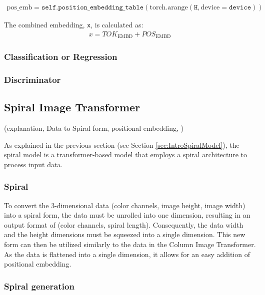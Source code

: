 \begin{align*}
    \text{pos\_emb} = \texttt{self.position\_embedding\_table}(\text{torch.arange}(\texttt{H}, \text{device}=\texttt{device}))
\end{align*}

The combined embedding, \texttt{x}, is calculated as:
\begin{align*}
    x = TOK_{\text{EMBD}} + POS_{\text{EMBD}}
\end{align*}

    

    \subsubsection{Classification or Regression}

    \subsubsection{Discriminator}

\newpage


\subsection{Spiral Image Transformer}
    (explanation, Data to Spiral form, positional embedding, )

    As explained in the previous section (see Section \ref{sec:IntroSpiralModel}), the spiral model is a transformer-based model that employs a spiral architecture to process input data. 

    \subsubsection{Spiral}

    To convert the 3-dimensional data (color channels, image height, image width) into a spiral form, the data must be unrolled into one dimension, resulting in an output format of (color channels, spiral length). Consequently, the data width and the height dimensions must be squeezed into a single dimension. This new form can then be utilized similarly to the data in the Column Image Transformer. As the data is flattened into a single dimension, it allows for an easy addition of positional embedding.

    \subsubsection{Spiral generation}

